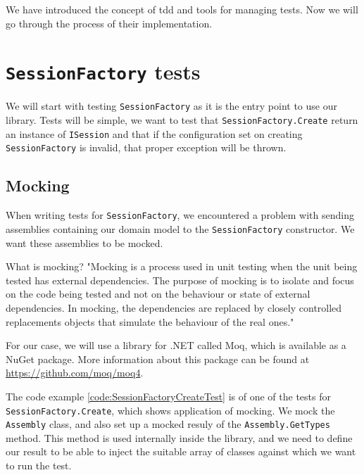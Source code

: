 We have introduced the concept of \acrshort{tdd} and tools for managing tests.
Now we will go through the process of their implementation.

\section{\texttt{SessionFactory} tests}

We will start with testing \texttt{SessionFactory} as it is the entry point to use our library. Tests will be simple,
we want to test that \texttt{SessionFactory.Create} return an instance of \texttt{ISession} and that if the configuration
set on creating \texttt{SessionFactory} is invalid, that proper exception will be thrown.

\subsection{Mocking}

When writing tests for \texttt{SessionFactory}, we encountered a problem with sending assemblies containing our domain model to the \texttt{SessionFactory} constructor.
We want these assemblies to be mocked.

What is mocking? "Mocking is a process used in unit testing when the unit being tested has external dependencies.
The purpose of mocking is to isolate and focus on the code being tested and not on the behaviour or state of external dependencies.
In mocking, the dependencies are replaced by closely controlled replacements objects that simulate the behaviour of the real ones." \cite{noauthor_mocking_nodate}

For our case, we will use a library for .NET called Moq, which is available as a NuGet package.
More information about this package can be found at \url{https://github.com/moq/moq4}.

The code example \ref{code:SessionFactoryCreateTest} is of one of the tests for \texttt{SessionFactory.Create}, which shows application of mocking.
We mock the \texttt{Assembly} class, and also set up a mocked resuly of the \texttt{Assembly.GetTypes} method.
This method is used internally inside the library, and we need to define our result to be able to inject the suitable array of classes against which we want to run the test.

